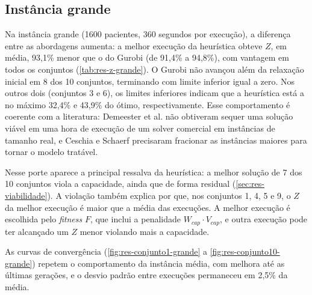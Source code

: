 \subsection{Instância grande}
\label{sec:res-grande}

Na instância grande (1600 pacientes, 360 segundos por execução), a diferença entre as abordagens aumenta: a melhor execução da heurística obteve $Z$, em média, 93,1\% menor que o do Gurobi (de 91,4\% a 94,8\%), com vantagem em todos os conjuntos (\autoref{tab:res-z-grande}). O Gurobi não avançou além da relaxação inicial em 8 dos 10 conjuntos, terminando com limite inferior igual a zero. Nos outros dois (conjuntos 3 e 6), os limites inferiores indicam que a heurística está a no máximo 32,4\% e 43,9\% do ótimo, respectivamente. Esse comportamento é coerente com a literatura: Demeester et al. \cite{demeester2010hybrid} não obtiveram sequer uma solução viável em uma hora de execução de um solver comercial em instâncias de tamanho real, e Ceschia e Schaerf \cite{ceschia2012modeling} precisaram fracionar as instâncias maiores para tornar o modelo tratável.

Nesse porte aparece a principal ressalva da heurística: a melhor solução de 7 dos 10 conjuntos viola a capacidade, ainda que de forma residual (\autoref{sec:res-viabilidade}). A violação também explica por que, nos conjuntos 1, 4, 5 e 9, o $Z$ da melhor execução é maior que a média das execuções. A melhor execução é escolhida pelo \textit{fitness} $F$, que inclui a penalidade $W_{cap} \cdot V_{cap}$, e outra execução pode ter alcançado um $Z$ menor violando mais a capacidade.

As curvas de convergência (\autoref{fig:res-conjunto1-grande} a \autoref{fig:res-conjunto10-grande}) repetem o comportamento da instância média, com melhora até as últimas gerações, e o desvio padrão entre execuções permaneceu em 2,5\% da média.

